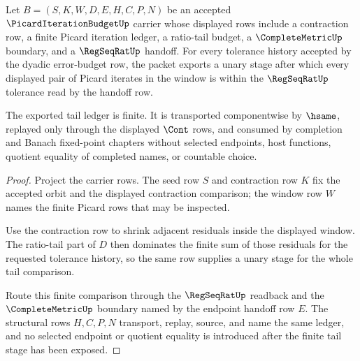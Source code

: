 \begin{theorem}
\label{thm:picard-iteration-budget-cauchy-tail}
Let $B=(S,K,W,D,E,H,C,P,N)$ be an accepted $\PicardIterationBudgetUp$ carrier whose displayed rows include a contraction row, a finite Picard iteration ledger, a ratio-tail budget, a $\CompleteMetricUp$ boundary, and a $\RegSeqRatUp$ handoff. For every tolerance history accepted by the dyadic error-budget row, the packet exports a unary stage after which every displayed pair of Picard iterates in the window is within the $\RegSeqRatUp$ tolerance read by the handoff row.

The exported tail ledger is finite. It is transported componentwise by $\hsame$, replayed only through the displayed $\Cont$ rows, and consumed by completion and Banach fixed-point chapters without selected endpoints, host functions, quotient equality of completed names, or countable choice.
\end{theorem}
\begin{proof}
Project the carrier rows. The seed row $S$ and contraction row $K$ fix the accepted orbit and the displayed contraction comparison; the window row $W$ names the finite Picard rows that may be inspected.

Use the contraction row to shrink adjacent residuals inside the displayed window. The ratio-tail part of $D$ then dominates the finite sum of those residuals for the requested tolerance history, so the same row supplies a unary stage for the whole tail comparison.

Route this finite comparison through the $\RegSeqRatUp$ readback and the $\CompleteMetricUp$ boundary named by the endpoint handoff row $E$. The structural rows $H,C,P,N$ transport, replay, source, and name the same ledger, and no selected endpoint or quotient equality is introduced after the finite tail stage has been exposed.
\end{proof}

